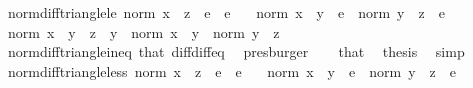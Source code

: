 \begin{isabellebody}
%
\endisatagproof
{\isafoldproof}%
%
\isadelimproof
\isanewline
%
\endisadelimproof
\isanewline
{}\isamarkupfalse%
\ norm{\isacharunderscore}{\kern0pt}diff{\isacharunderscore}{\kern0pt}triangle{\isacharunderscore}{\kern0pt}le{\isacharcolon}{\kern0pt}\ {\isachardoublequoteopen}norm\ {\isacharparenleft}{\kern0pt}x\ {\isacharminus}{\kern0pt}\ z{\isacharparenright}{\kern0pt}\ {\isasymle}\ e{}\ {\isacharplus}{\kern0pt}\ e{}{\isachardoublequoteclose}\isanewline
\ \ \ {\isachardoublequoteopen}norm\ {\isacharparenleft}{\kern0pt}x\ {\isacharminus}{\kern0pt}\ y{\isacharparenright}{\kern0pt}\ {\isasymle}\ e{}{\isachardoublequoteclose}\ \ {\isachardoublequoteopen}norm\ {\isacharparenleft}{\kern0pt}y\ {\isacharminus}{\kern0pt}\ z{\isacharparenright}{\kern0pt}\ {\isasymle}\ e{}{\isachardoublequoteclose}\isanewline
%
\isadelimproof
%
\endisadelimproof
%
\isatagproof
{}\isamarkupfalse%
\ {\isacharminus}{\kern0pt}\isanewline
\ \ \isamarkupfalse%
\ {\isachardoublequoteopen}norm\ {\isacharparenleft}{\kern0pt}x\ {\isacharminus}{\kern0pt}\ {\isacharparenleft}{\kern0pt}y\ {\isacharplus}{\kern0pt}\ z\ {\isacharminus}{\kern0pt}\ y{\isacharparenright}{\kern0pt}{\isacharparenright}{\kern0pt}\ {\isasymle}\ norm\ {\isacharparenleft}{\kern0pt}x\ {\isacharminus}{\kern0pt}\ y{\isacharparenright}{\kern0pt}\ {\isacharplus}{\kern0pt}\ norm\ {\isacharparenleft}{\kern0pt}y\ {\isacharminus}{\kern0pt}\ z{\isacharparenright}{\kern0pt}{\isachardoublequoteclose}\isanewline
\ \ \ \ \isamarkupfalse%
\ norm{\isacharunderscore}{\kern0pt}diff{\isacharunderscore}{\kern0pt}triangle{\isacharunderscore}{\kern0pt}ineq\ that\ diff{\isacharunderscore}{\kern0pt}diff{\isacharunderscore}{\kern0pt}eq{}\ \isamarkupfalse%
\ presburger\isanewline
\ \ \isamarkupfalse%
\ that\ \isamarkupfalse%
\ {\isacharquery}{\kern0pt}thesis\ \isamarkupfalse%
\ simp\isanewline
{}\isamarkupfalse%
%
\endisatagproof
{\isafoldproof}%
%
\isadelimproof
\isanewline
%
\endisadelimproof
\isanewline
{}\isamarkupfalse%
\ norm{\isacharunderscore}{\kern0pt}diff{\isacharunderscore}{\kern0pt}triangle{\isacharunderscore}{\kern0pt}less{\isacharcolon}{\kern0pt}\ {\isachardoublequoteopen}norm\ {\isacharparenleft}{\kern0pt}x\ {\isacharminus}{\kern0pt}\ z{\isacharparenright}{\kern0pt}\ {\isacharless}{\kern0pt}\ e{}\ {\isacharplus}{\kern0pt}\ e{}{\isachardoublequoteclose}\isanewline
\ \ \ {\isachardoublequoteopen}norm\ {\isacharparenleft}{\kern0pt}x\ {\isacharminus}{\kern0pt}\ y{\isacharparenright}{\kern0pt}\ {\isacharless}{\kern0pt}\ e{}{\isachardoublequoteclose}\ \ {\isachardoublequoteopen}norm\ {\isacharparenleft}{\kern0pt}y\ {\isacharminus}{\kern0pt}\ z{\isacharparenright}{\kern0pt}\ {\isacharless}{\kern0pt}\ e{}{\isachardoublequoteclose}\isanewline

\end{isabellebody}
